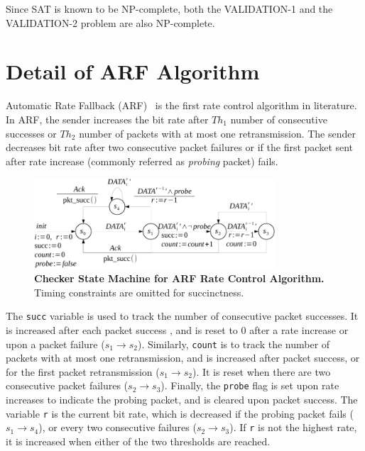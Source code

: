 Since SAT is known to be NP-complete, both the VALIDATION-1 and the
VALIDATION-2 problem are also NP-complete.

\section{Detail of ARF Algorithm}
Automatic Rate Fallback (ARF)~\cite{kamerman1997wavelan} is the first rate
control algorithm in literature. In ARF, the sender increases the bit rate after
$Th_1$ number of consecutive successes or $Th_2$ number of packets with at most
one retransmission. The sender decreases bit rate after two consecutive packet
failures or if the first packet sent after rate increase (commonly referred as
\textit{probing} packet) fails.


\begin{figure}[h!]
  \centering
  \includegraphics[width=0.8\textwidth]{./figures/arf_sm.pdf}
  \caption{\textbf{Checker State Machine for ARF Rate Control Algorithm.} Timing
  constraints are omitted for succinctness.}
  \label{fig:arf_sm}
\end{figure}


The \texttt{succ} variable is used to track the number of consecutive packet
successes. It is increased after each packet success , and is reset to 0 after a
rate increase or upon a packet failure ($s_1\rightarrow s_2$).  Similarly,
\texttt{count} is to track the number of packets with at most one
retransmission, and is increased after packet success, or for the first packet
retransmission ($s_1\rightarrow s_2$). It is reset when there are two
consecutive packet failures ($s_2\rightarrow s_3$). Finally, the \texttt{probe}
flag is set upon rate increases to indicate the probing packet, and is cleared
upon packet success. The variable \texttt{r} is the current bit rate, which is
decreased if the probing packet fails ($s_1\rightarrow s_4$), or every two
consecutive failures ($s_2\rightarrow s_3$). If \texttt{r} is not the highest
rate, it is increased when either of the two thresholds are reached.


